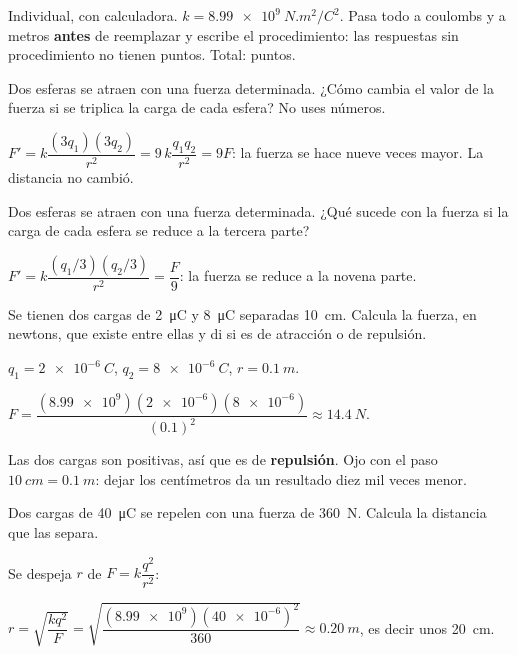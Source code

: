 \documentclass[11pt]{article}
\begin{document}
\encabezado

\begin{instrucciones}
Individual, con calculadora. $k = \qty{8,99e9}{N.m^2/C^2}$. Pasa todo a coulombs y a metros
\textbf{antes} de reemplazar y escribe el procedimiento: las respuestas sin procedimiento no
tienen puntos. Total: \totalpuntos{} puntos.
\end{instrucciones}

\begin{preguntas}

\pregunta[1] Dos esferas se atraen con una fuerza determinada. ¿Cómo cambia el valor de la
fuerza si se triplica la carga de cada esfera? No uses números.
\espacio{2.5cm}
\begin{solucion}
$F' = k\dfrac{(3q_1)(3q_2)}{r^2} = 9\,k\dfrac{q_1 q_2}{r^2} = 9F$: la fuerza se hace nueve
veces mayor. La distancia no cambió.
\end{solucion}

\pregunta[1] Dos esferas se atraen con una fuerza determinada. ¿Qué sucede con la fuerza si la
carga de cada esfera se reduce a la tercera parte?
\espacio{2.5cm}
\begin{solucion}
$F' = k\dfrac{(q_1/3)(q_2/3)}{r^2} = \dfrac{F}{9}$: la fuerza se reduce a la novena parte.
\end{solucion}

\pregunta[1.5] Se tienen dos cargas de \qty{2}{\micro\coulomb} y \qty{8}{\micro\coulomb}
separadas \qty{10}{cm}. Calcula la fuerza, en newtons, que existe entre ellas y di si es de
atracción o de repulsión.
\espacio{4cm}
\begin{solucion}
$q_1 = \qty{2e-6}{C}$, $q_2 = \qty{8e-6}{C}$, $r = \qty{0,1}{m}$.

$F = \dfrac{(\num{8,99e9})(\num{2e-6})(\num{8e-6})}{(\num{0,1})^2} \approx \qty{14,4}{N}$.

Las dos cargas son positivas, así que es de \textbf{repulsión}. Ojo con el paso
$\qty{10}{cm} = \qty{0,1}{m}$: dejar los centímetros da un resultado diez mil veces menor.
\end{solucion}

\pregunta[1.5] Dos cargas de \qty{40}{\micro\coulomb} se repelen con una fuerza de
\qty{360}{N}. Calcula la distancia que las separa.
\espacio{4cm}
\begin{solucion}
Se despeja $r$ de $F = k\dfrac{q^2}{r^2}$:

$r = \sqrt{\dfrac{k q^2}{F}} =
\sqrt{\dfrac{(\num{8,99e9})(\num{40e-6})^2}{360}} \approx \qty{0,20}{m}$, es decir unos
\qty{20}{cm}.
\end{solucion}

\end{preguntas}
\end{document}
